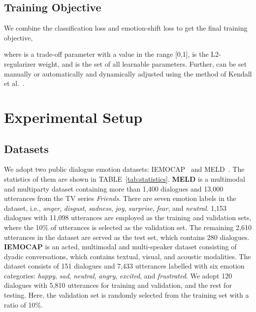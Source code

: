 \documentclass[journal]{IEEEtran}
\begin{document}
\subsection{Training Objective}
We combine the classification loss  and emotion-shift loss  to get the final training objective,

where  is a trade-off parameter with a value in the range [0,1],  is the L2-regularizer weight, and  is the set of all learnable parameters. Further,  can be set manually or automatically and dynamically adjusted using the method of Kendall et al.~\cite{kendall2018multi}.

\section{Experimental Setup}\label{setup} 
\subsection{Datasets}
We adopt two public dialogue emotion datasets: IEMOCAP~\cite{busso2008iemocap} and MELD~\cite{poria2018meld}. The statistics of them are shown in TABLE~\ref{tab:statistics}. 
\textbf{MELD} is a multimodal and multiparty dataset containing more than 1,400 dialogues and 13,000 utterances from the TV series \textit{Friends}. There are seven emotion labels in the dataset, i.e., \textit{anger}, \textit{disgust}, \textit{sadness}, \textit{joy}, \textit{surprise}, \textit{fear}, and \textit{neutral}. 1,153 dialogues with 11,098 utterances are employed as the training and validation sets, where the 10\% of utterances is selected as the validation set. The remaining 2,610 utterances in the dataset are served as the test set, which contains 280 dialogues. 
\textbf{IEMOCAP} is an acted, multimodal and multi-speaker dataset consisting of dyadic conversations, which contains textual, visual, and acoustic modalities. The dataset consists of 151 dialogues and 7,433 utterances labelled with six emotion categories: \textit{happy}, \textit{sad}, \textit{neutral}, \textit{angry}, \textit{excited}, and \textit{frustrated}. We adopt 120 dialogues with 5,810 utterances for training and validation, and the rest for testing. Here, the validation set is randomly selected from the training set with a ratio of 10\%.
\end{document}
